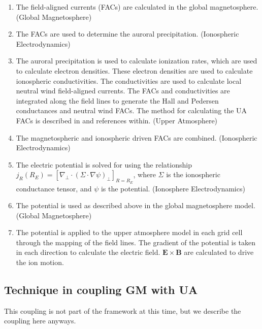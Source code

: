 \documentclass[twoside,10pt]{article}
\begin{document}
\begin{enumerate}

\item
The field-aligned currents (FACs) are calculated in the global
magnetosphere.  (Global Magnetosphere)

\item
The FACs are used to determine the auroral precipitation. (Ionospheric
Electrodynamics)

\item
The auroral precipitation is used to calculate ionization rates, which
are used to calculate electron densities.  These electron densities
are used to calculate ionospheric conductivities.  The conductivities
are used to calculate local neutral wind field-aligned currents.  The
FACs and conductivities are integrated along the field lines to
generate the Hall and Pedersen conductances and neutral wind FACs.
The method for calculating the UA FACs is described in
\cite{ridley_coupled} and references within. (Upper Atmosphere)

\item
The magnetospheric and ionospheric driven FACs are combined. (Ionospheric
Electrodynamics)

\item
The electric potential is solved for using the relationship $j_R(R_E)
=[{\nabla}_{\perp}{\cdot}({\Sigma}{\cdot}{\nabla}{\psi})_{\perp}]_{R=R_E}$,
where $\Sigma$ is the ionospheric conductance tensor, and $\psi$ is
the potential. (Ionosphere Electrodynamics)

\item
The potential is used as described above in the global magnetosphere model.
(Global Magnetosphere)

\item
The potential is applied to the upper atmosphere model in each grid
cell through the mapping of the field lines.  The gradient of the
potential is taken in each direction to calculate the electric field.
$\mathbf{E} \times \mathbf{B}$ are calculated to drive the ion motion.

\end{enumerate}

\subsection{Technique in coupling GM with UA}

This coupling is not part of the framework at this time, but we describe
the coupling here anyways.
\end{document}
